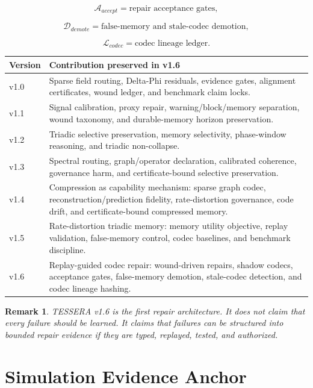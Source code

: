 \documentclass[12pt]{article}
\newtheorem{remark}{Remark}
\begin{document}
\[
\mathcal{A}_{accept}=\text{repair acceptance gates},
\]

\[
\mathcal{D}_{demote}=\text{false-memory and stale-codec demotion},
\]

\[
\mathcal{L}_{codec}=\text{codec lineage ledger}.
\]

\begin{longtable}{p{}p{}}
\toprule
\textbf{Version} & \textbf{Contribution preserved in v1.6} \\
\midrule
v1.0 & Sparse field routing, Delta-Phi residuals, evidence gates,
alignment certificates, wound ledger, and benchmark claim locks. \\
v1.1 & Signal calibration, proxy repair, warning/block/memory separation,
wound taxonomy, and durable-memory horizon preservation. \\
v1.2 & Triadic selective preservation, memory selectivity, phase-window
reasoning, and triadic non-collapse. \\
v1.3 & Spectral routing, graph/operator declaration, calibrated coherence,
governance harm, and certificate-bound selective preservation. \\
v1.4 & Compression as capability mechanism: sparse graph codec,
reconstruction/prediction fidelity, rate-distortion governance, code drift,
and certificate-bound compressed memory. \\
v1.5 & Rate-distortion triadic memory: memory utility objective, replay
validation, false-memory control, codec baselines, and benchmark discipline. \\
v1.6 & Replay-guided codec repair: wound-driven repairs, shadow codecs,
acceptance gates, false-memory demotion, stale-codec detection, and codec
lineage hashing. \\
\bottomrule
\end{longtable}

\begin{remark}
TESSERA v1.6 is the first repair architecture. It does not claim that every
failure should be learned. It claims that failures can be structured into
bounded repair evidence if they are typed, replayed, tested, and authorized.
\end{remark}

\section{Simulation Evidence Anchor}
\end{document}

